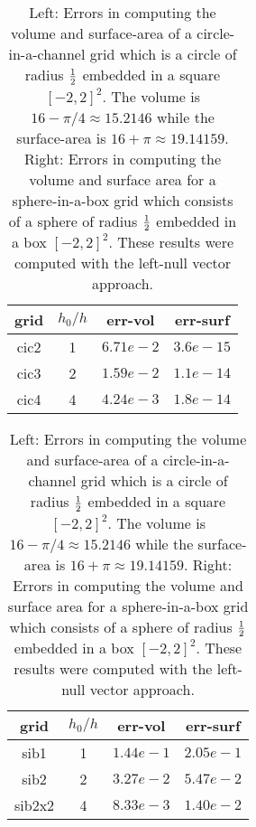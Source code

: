 \begin{table}[hbt]
\begin{center}
\begin{tabular}{|c|c|c|c|} \hline 
  grid  &  $h_0/h$   & err-vol       & err-surf    \\   \hline\hline 
 cic2   &    1       &  $6.71e-2$    & $3.6e-15$     \\ 
 cic3   &    2       &  $1.59e-2$    & $1.1e-14$  \\ 
 cic4   &    4       &  $4.24e-3$    & $1.8e-14$     \\ \hline 
\end{tabular}	
\qquad
\begin{tabular}{|c|c|c|c|} \hline 
  grid  &  $h_0/h$   & err-vol       & err-surf    \\   \hline\hline 
 sib1   &    1       &  $1.44e-1$    & $2.05e-1$     \\ 
 sib2   &    2       &  $3.27e-2$    & $5.47e-2$  \\ 
 sib2x2 &    4       &  $8.33e-3$    & $1.40e-2$     \\ \hline 
\end{tabular}	
\qquad

\end{center}		
\caption{Left: Errors in computing the volume and surface-area of a circle-in-a-channel grid which
is a circle of radius ${1\over2}$ embedded in a square $[-2,2]^2$. The 
volume is $16-\pi/4\approx 15.2146$ while the surface-area is $16+\pi\approx 19.14159$.
Right: Errors in computing the volume and surface area for a sphere-in-a-box grid which
consists of a sphere of radius ${1\over2}$ embedded in a box $[-2,2]^2$. These results
were computed with the left-null vector approach.       }
 \label{tab:cic} 
\end{table}

% 
% 

